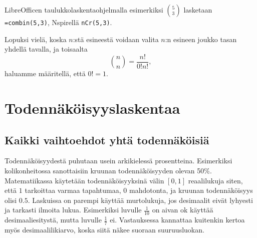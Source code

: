 \documentclass[12pt,leqno,a4paper,oneside]{amsart}
\theoremstyle{definition}
\theoremstyle{remark}
\numberwithin{equation}{section}
\begin{document}

LibreOfficen taulukkolaskentaohjelmalla esimerkiksi ${5\choose 3}$ lasketaan \texttt{=combin(5,3)}, Nspirellä \texttt{nCr(5,3)}.





\label{lottolkm}

Lopuksi vielä, koska $n$:stä esineestä voidaan valita $n$:n esineen joukko tasan yhdellä tavalla, ja toisaalta
$${n \choose n} = \frac{n!}{0! n!} ,$$
haluamme määritellä, että $0!=1.$


\section{Todennäköisyyslaskentaa}

\subsection{Kaikki vaihtoehdot yhtä todennäköisiä}

\hspace{10pt}

Todennäköisyydestä puhutaan usein arkikielessä prosentteina. Esimerkiksi kolikonheitossa sanottaisiin kruunan todennäköisyyden olevan 50\%.
Ma\-te\-ma\-tii\-kas\-sa käytetään todennäköisyyksinä välin $[0,1]$ reaalilukuja siten, että $1$ tarkoittaa varmaa tapahtumaa, $0$ mahdotonta, ja kruunan
todennäköisyys olisi $0.5$. Laskuissa on parempi käyttää murtolukuja, jos desimaalit eivät lyhyesti ja tarkasti ilmoita lukua. Esimerkiksi luvulle
$\frac{1}{10}$ on aivan ok käyttää desimaaliesitystä, mutta luvulle $\frac{1}{7}$ ei. Vastauksessa kannattaa kuitenkin kertoa myös desimaalilikiarvo,
koska siitä näkee suoraan suuruusluokan.
\end{document}
